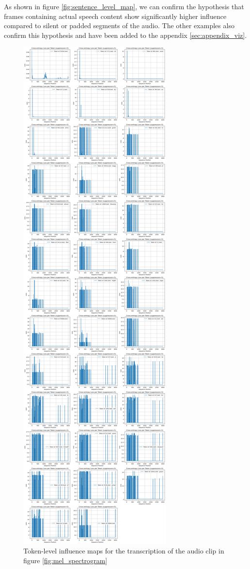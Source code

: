 \documentclass[../report.tex]{subfiles}
\begin{document}
    As shown in figure \ref{fig:sentence_level_map}, we can confirm the hypothesis that frames containing actual speech content show significantly higher influence compared to silent or padded segments of the audio. The other examples also confirm this hypothesis and have been added to the appendix \ref{sec:appendix_viz}.

    \begin{figure}[p]
        \centering
        \includegraphics[width=\textwidth,height=0.9\textheight,keepaspectratio]{figures/per_token_5_5.png}
        \caption{Token-level influence maps for the transcription of the audio clip in figure \ref{fig:mel_spectrogram}}
        \label{fig:token_level_map}
    \end{figure}
\end{document}
